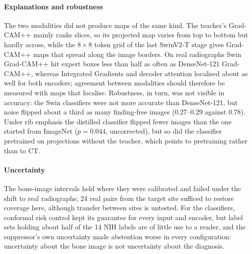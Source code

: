 \paragraph{Explanations and robustness} The two modalities did not produce maps of the same kind. The teacher's Grad-CAM++ mainly ranks
slices, so its projected map varies from top to bottom but hardly across, while the $8\times8$ token grid of the last SwinV2-T stage gives
Grad-CAM++ maps that spread along the image borders. On real radiographs Swin Grad-CAM++ hit expert boxes less than half as often as
DenseNet-121 Grad-CAM++, whereas Integrated Gradients and decoder attention localised about as well for both encoders; agreement between
modalities should therefore be measured with maps that localise. Robustness, in turn, was not visible in accuracy: the Swin classifiers were
not more accurate than DenseNet-121, but noise flipped about a third as many finding-free images (0.27--0.29 against 0.78). Under rib
emphasis the distilled classifier flipped fewer images than the one started from ImageNet ($p=0.044$, uncorrected), but so did the
classifier pretrained on projections without the teacher, which points to pretraining rather than to CT.

\paragraph{Uncertainty} The bone-image intervals held where they were calibrated and failed under the shift to real radiographs; 24 real pairs
from the target site sufficed to restore coverage here, although transfer between sites is untested. For the classifiers, conformal risk
control kept its guarantee for every input and encoder, but label sets holding about half of the 14 NIH labels are of little use to a
reader, and the suppressor's own uncertainty made abstention worse in every configuration: uncertainty about the bone image is not
uncertainty about the diagnosis.

